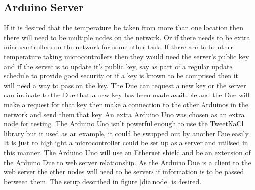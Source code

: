 \subsection{Arduino Server}

If it is desired that the temperature be taken from more than one location then there will need to be multiple nodes on the network. Or if there needs to be extra microcontrollers on the network for some other task. If there are to be other temperature taking microcontrollers then they would need the server's public key and if the server is to update it's public key, say as part of a regular update schedule to provide good security or if a key is known to be comprised then it will need a way to pass on the key. The Due can request a new key or the server can indicate to the Due that a new key has been made available and the Due will make a request for that key then make a connection to the other Arduinos in the network and send them that key. An extra Arduino Uno was chosen as an extra node for testing. The Arduino Uno isn't powerful enough to use the TweetNaCl library but it used as an example, it could be swapped out by another Due easily. It is just to highlight a microcontroller could be set up as a server and utilised in this manner. The Arduino Uno will use an Ethernet shield and be an extension of the Arduino Due to web server relationship. As the Arduino Due is a client to the web server the other nodes will need to be servers if information is to be passed between them. The setup described in figure \ref{dia:node} is desired. 